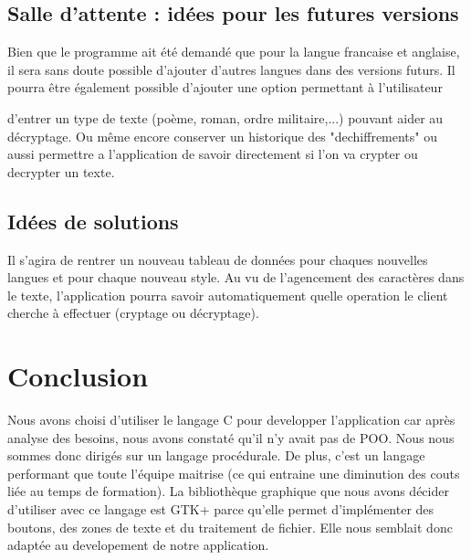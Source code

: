 \documentclass[a4]{article}
\begin{document}
		\subsection{Salle d’attente : idées pour les futures versions}
			Bien que le programme ait été demandé que pour la langue francaise et anglaise, 
			il sera sans doute possible d'ajouter d'autres langues dans des versions futurs. 
			Il pourra être également possible d'ajouter une option permettant à l'utilisateur

			d'entrer un type de texte (poème, roman, ordre militaire,...) pouvant aider au décryptage. Ou même encore conserver un historique des "dechiffrements" ou aussi permettre a l'application de savoir directement si l'on va crypter ou decrypter un texte.

		\subsection{Idées de solutions}
		 	Il s'agira de rentrer un nouveau tableau de données pour chaques nouvelles langues et pour chaque nouveau style.
			Au vu de l'agencement des caractères dans le texte, l'application pourra savoir automatiquement quelle operation le client cherche à effectuer (cryptage ou décryptage).
			
			\section{Conclusion}
			 Nous avons choisi d'utiliser le langage C pour developper l'application car après analyse des besoins, nous avons constaté qu'il n'y avait pas 
			 de POO. Nous nous sommes donc dirigés sur un langage procédurale. De plus, c'est un langage performant que toute l'équipe maitrise (ce qui entraine une diminution des couts liée au temps de formation).
			 La bibliothèque graphique que nous avons décider d'utiliser avec ce langage est GTK+ parce qu'elle permet d'implémenter des boutons, des zones de texte et du traitement de fichier.
			 Elle nous semblait donc adaptée au developement de notre application.
			
\end{document}
